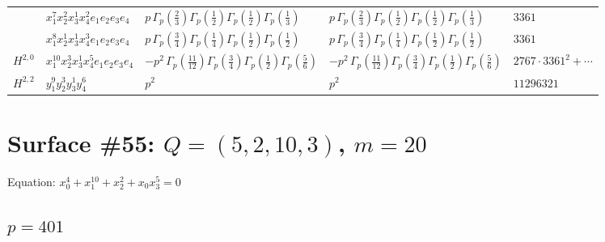 \documentclass[11pt]{article}
\begin{document}
\begin{table}[ht]
{\begin{tabular}{@{}lllll@{}}
 & $x_{1}^{7} x_{2}^{2} x_{3}^{1} x_{4}^{2}  e_{1} e_{2} e_{3} e_{4}$ & $p \, \Gamma_p \left( \frac{2}{3} \right) \Gamma_p \left( \frac{1}{2} \right) \Gamma_p \left( \frac{1}{2} \right) \Gamma_p \left( \frac{1}{3} \right)$ & $p \, \Gamma_p \left( \frac{2}{3} \right) \Gamma_p \left( \frac{1}{2} \right) \Gamma_p \left( \frac{1}{2} \right) \Gamma_p \left( \frac{1}{3} \right)$ & $3361$ \\
 & $x_{1}^{8} x_{2}^{1} x_{3}^{1} x_{4}^{3}  e_{1} e_{2} e_{3} e_{4}$ & $p \, \Gamma_p \left( \frac{3}{4} \right) \Gamma_p \left( \frac{1}{4} \right) \Gamma_p \left( \frac{1}{2} \right) \Gamma_p \left( \frac{1}{2} \right)$ & $p \, \Gamma_p \left( \frac{3}{4} \right) \Gamma_p \left( \frac{1}{4} \right) \Gamma_p \left( \frac{1}{2} \right) \Gamma_p \left( \frac{1}{2} \right)$ & $3361$ \\
\midrule
$H^{2,0}$ & $x_{1}^{10} x_{2}^{3} x_{3}^{1} x_{4}^{5}  e_{1} e_{2} e_{3} e_{4}$ & $- p^{2} \, \Gamma_p \left( \frac{11}{12} \right) \Gamma_p \left( \frac{3}{4} \right) \Gamma_p \left( \frac{1}{2} \right) \Gamma_p \left( \frac{5}{6} \right)$ & $- p^{2} \, \Gamma_p \left( \frac{11}{12} \right) \Gamma_p \left( \frac{3}{4} \right) \Gamma_p \left( \frac{1}{2} \right) \Gamma_p \left( \frac{5}{6} \right)$ & $2767{\cdot}3361^{2}{+}\cdots$ \\
\midrule
$H^{2,2}$ & $y_{1}^{9} y_{2}^{3} y_{3}^{1} y_{4}^{6}$ & $p^{2} \,$ & $p^{2} \,$ & $11296321$ \\
\bottomrule
\end{tabular}
}
\renewcommand{\arraystretch}{1.0}
\end{table}

\newpage

\section*{Surface \#55: $Q=(5, 2, 10, 3)$, $m=20$}

Equation: $x_0^{4} + x_1^{10} + x_2^{2} + x_0 x_3^{5} = 0$

\subsection*{$p = 401$}
\end{document}
